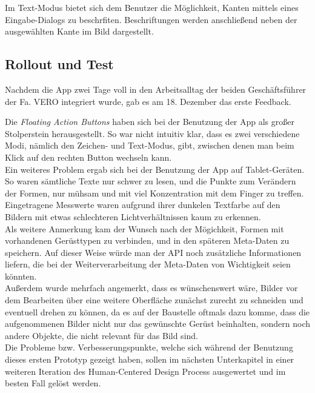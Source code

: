 Im Text-Modus bietet sich dem Benutzer die Möglichkeit, Kanten mittels eines Eingabe-Dialogs zu beschrfiten.
Beschriftungen werden anschließend neben der ausgewählten Kante im Bild dargestellt. \\

\subsection{Rollout und Test}
Nachdem die App zwei Tage voll in den Arbeitsalltag der beiden Geschäftsführer der Fa. VERO integriert wurde, gab es am 18. Dezember das erste Feedback.

Die \emph{Floating Action Buttons} haben sich bei der Benutzung der App als großer Stolperstein herausgestellt.
So war nicht intuitiv klar, dass es zwei verschiedene Modi, nämlich den Zeichen- und Text-Modus, gibt, zwischen denen man beim Klick auf den rechten Button wechseln kann. \\

Ein weiteres Problem ergab sich bei der Benutzung der App auf Tablet-Geräten.
So waren sämtliche Texte nur schwer zu lesen, und die Punkte zum Verändern der Formen, nur mühsam und mit viel Konzentration mit dem Finger zu treffen. \\

Eingetragene Messwerte waren aufgrund ihrer dunkelen Textfarbe auf den Bildern mit etwas schlechteren Lichtverhältnissen kaum zu erkennen. \\

Als weitere Anmerkung kam der Wunsch nach der Mögichkeit, Formen mit vorhandenen Gerüsttypen zu verbinden, und in den späteren Meta-Daten zu speichern.
Auf dieser Weise würde man der API noch zusätzliche Informationen liefern, die bei der Weiterverarbeitung der Meta-Daten von Wichtigkeit seien könnten. \\

Außerdem wurde mehrfach angemerkt, dass es wünschenswert wäre, Bilder vor dem Bearbeiten über eine weitere Oberfläche zunächst zurecht zu schneiden und eventuell drehen zu können, da es auf der Baustelle oftmals dazu komme, dass die aufgenommenen Bilder nicht nur das gewünschte Gerüst beinhalten, sondern noch andere Objekte, die nicht relevant für das Bild sind. \\

Die Probleme bzw. Verbesserungspunkte, welche sich während der Benutzung dieses ersten Prototyp gezeigt haben, sollen im nächsten Unterkapitel in einer weiteren Iteration des Human-Centered Design Process ausgewertet und im besten Fall gelöst werden.

